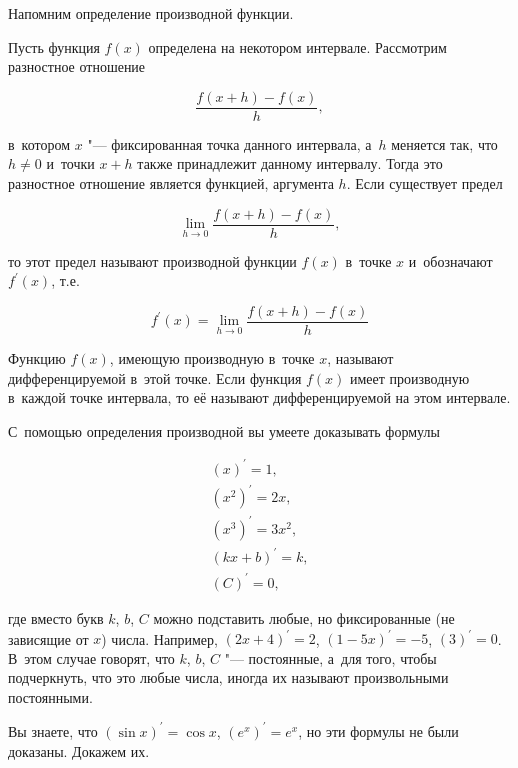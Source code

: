 
Напомним определение производной функции.

Пусть функция $f(x)$ определена на некотором интервале.
Рассмотрим разностное отношение

\begin{equation*}
\displaystyle \frac{f(x + h) - f(x)}{h},
\end{equation*}

\noindent
в~котором $x$ "--- фиксированная точка данного интервала, а~$h$ меняется так,
что $h \ne 0$ и~точки $x + h$ также принадлежит данному интервалу.
Тогда это разностное отношение является функцией, аргумента $h$.
Если существует предел

\begin{equation*}
\displaystyle \lim_{h \to 0} \frac{f(x + h) - f(x)}{h},
\end{equation*}

\noindent
то этот предел называют производной функции $f(x)$ в~точке $x$
и~обозначают $f^\prime(x)$, т.е.\

\begin{equation*}
\displaystyle f^\prime(x) = \lim_{h \to 0} \frac{f(x + h) - f(x)}{h}
\end{equation*}

Функцию $f(x)$, имеющую производную в~точке $x$, называют дифференцируемой в~этой точке.
Если функция $f(x)$ имеет производную в~каждой точке интервала, то её называют
дифференцируемой на этом интервале.

С~помощью определения производной вы умеете доказывать формулы

\begin{gather*}
(x)^\prime = 1, \\
(x^{2})^\prime = 2x, \\
(x^{3})^\prime = 3x^{2}, \\
(kx + b)^\prime = k, \\
(C)^\prime = 0,
\end{gather*}

\noindent
где вместо букв $k$, $b$, $C$ можно подставить любые, но фиксированные
(не зависящие от $x$) числа.
Например, $(2x + 4)^\prime = 2$, $(1 - 5x)^\prime = -5$, $(3)^\prime = 0$.
В~этом случае говорят, что $k$, $b$, $C$ "--- постоянные,
а~для того, чтобы подчеркнуть, что это любые числа, иногда их называют
произвольными постоянными.

Вы знаете, что $(\sin x)^\prime = \cos x$, $\left( e^{x} \right)^\prime = e^{x}$,
но эти формулы не были доказаны. Докажем их.

